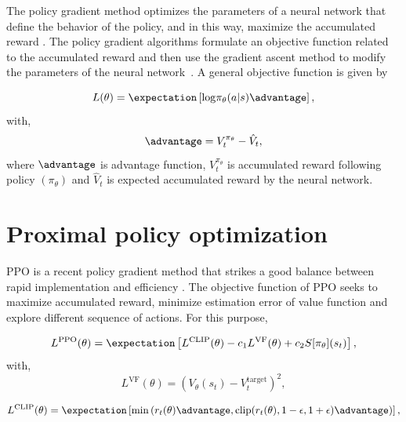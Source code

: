 The policy gradient method optimizes the parameters of a neural network that define the behavior of the policy, and in this way, maximize the accumulated reward \cite{sutton2018reinforcement}. The policy gradient algorithms formulate an objective function related to the accumulated reward and then use the gradient ascent method to modify the parameters of the neural network~\cite{thomas2017policy}. A general objective function is given by

\begin{equation*}
	L(\theta) = \expectation \left[ \mathrm{log} \pi_\theta (a|s) \advantage  \right],			
\end{equation*}
with,
\begin{equation*}
	\advantage = V^{\pi_{\theta}}_{t}  - \hat{V}_{t}, 
\end{equation*}
\noindent where $\advantage$ is advantage function, $V^{\pi_{\theta}}_{t}$ is accumulated reward following policy $(\pi_\theta)$ and $\hat{V}_{t}$ is expected accumulated reward by the neural network.


\section{Proximal policy optimization}
PPO is a recent policy gradient method that strikes a good balance between rapid implementation and efficiency \cite{schulman2017proximal}. The objective function of PPO seeks to maximize accumulated reward, minimize estimation error of value function and explore different sequence of actions. For this purpose, 


\begin{equation*}
	L^{\mathrm{PPO}}(\theta) = \expectation \left[  L^{\mathrm{CLIP}}(\theta) - c_1 L^{\mathrm{VF}}(\theta)  + c_2 S[\pi_\theta](s_t)  \right],			
\end{equation*}	
with,
\begin{equation*}
	L^{\mathrm{VF}}(\theta) = \left( V_\theta (s_t) - V^{\mathrm{target}}_{t}  \right)^{2},
\end{equation*}			

\begin{equation*}
	L^{\mathrm{CLIP}}(\theta) = \expectation \left[ \mathrm{min} \left(  r_{t}(\theta)  \advantage,  \mathrm{clip} (r_{t}(\theta) , 1-\epsilon, 1+\epsilon) \advantage  \right)  \right],			
\end{equation*}	





